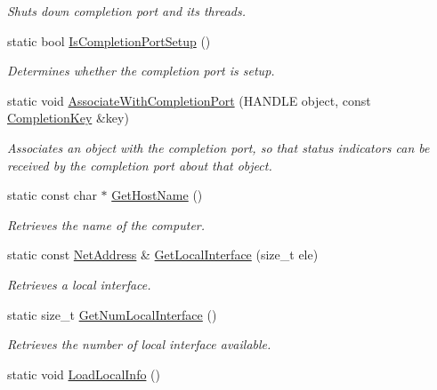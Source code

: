 \begin{DoxyCompactItemize}
\begin{DoxyCompactList}\small\item\em Shuts down completion port and its threads. \item\end{DoxyCompactList}\item 
static bool \hyperlink{class_net_utility_abb0a78cab44c3f605474b6de38308a37}{IsCompletionPortSetup} ()
\begin{DoxyCompactList}\small\item\em Determines whether the completion port is setup. \item\end{DoxyCompactList}\item 
static void \hyperlink{class_net_utility_af33b8d32b789de4cdec378d442662096}{AssociateWithCompletionPort} (HANDLE object, const \hyperlink{class_completion_key}{CompletionKey} \&key)
\begin{DoxyCompactList}\small\item\em Associates an object with the completion port, so that status indicators can be received by the completion port about that object. \item\end{DoxyCompactList}\item 
static const char $\ast$ \hyperlink{class_net_utility_a2bcea9d3bdb880dde7870333fb7033f6}{GetHostName} ()
\begin{DoxyCompactList}\small\item\em Retrieves the name of the computer. \item\end{DoxyCompactList}\item 
static const \hyperlink{class_net_address}{NetAddress} \& \hyperlink{class_net_utility_aa014d19c36866c5be2715dec110f09ee}{GetLocalInterface} (size\_\-t ele)
\begin{DoxyCompactList}\small\item\em Retrieves a local interface. \item\end{DoxyCompactList}\item 
static size\_\-t \hyperlink{class_net_utility_a5b29758025dba92128f60a2240458552}{GetNumLocalInterface} ()
\begin{DoxyCompactList}\small\item\em Retrieves the number of local interface available. \item\end{DoxyCompactList}\item 
\hypertarget{class_net_utility_a4a35e8694ff38e90f3b84c81ac108300}{
static void \hyperlink{class_net_utility_a4a35e8694ff38e90f3b84c81ac108300}{LoadLocalInfo} ()}
\label{class_net_utility_a4a35e8694ff38e90f3b84c81ac108300}


\end{DoxyCompactItemize}

